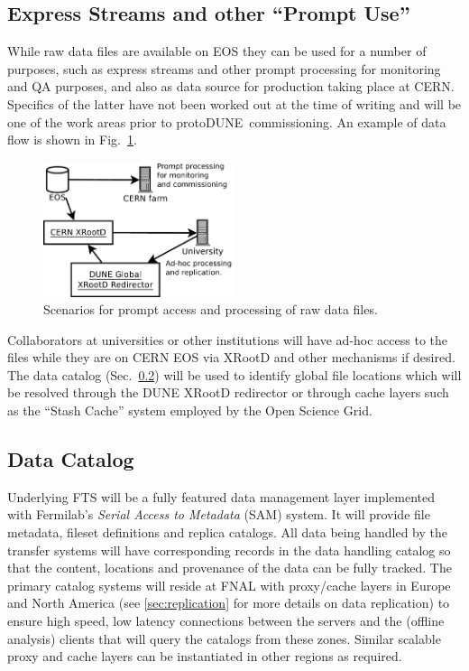 \documentclass[pdftex,12pt,letter]{article}
\newcommand{\pd}{protoDUNE\ }
\begin{document}
\subsection{Express Streams and other ``Prompt Use''}
\label{sec:prompt}

While raw data files are available on EOS they can be
used for a number of purposes, such as express streams and
other prompt processing for monitoring and QA purposes,
and also as data source for production taking place at CERN.
Specifics of the latter have not been  worked out at the time of writing
and will be one of the work areas prior to \pd commissioning.
An example of data flow is shown in Fig.~\ref{fig:prompt}.

\begin{figure}[tbh]
  \centering
  \includegraphics[width=0.5\textwidth]{prompt.pdf}
  \caption{Scenarios for prompt access and processing of raw data files.}
  \label{fig:prompt}
\end{figure}


\noindent Collaborators at universities or other institutions will have ad-hoc
access to the files while they are on CERN EOS via XRootD and other mechanisms if desired. 
The data catalog (Sec.~\ref{sec:sam}) will be used to identify global file
locations which will be resolved through the DUNE XRootD redirector or
through cache layers such as the ``Stash Cache'' system employed by
the Open Science Grid.

\subsection{Data Catalog}
\label{sec:sam}

Underlying FTS will be a fully featured data management layer
implemented with Fermilab's \textit{Serial Access to Metadata} (SAM) system.
It will provide file metadata, fileset definitions and replica
catalogs.  All data being handled by the transfer systems will have
corresponding records in the data handling catalog so that the
content, locations and provenance of the data can be fully tracked.
The primary catalog systems will reside at FNAL with proxy/cache
layers in Europe and North America (see \ref{sec:replication}
for more details on data replication) to ensure high speed,
low latency connections between the servers and the (offline analysis)
clients that will query the catalogs from these zones.  Similar
scalable proxy and cache layers can be instantiated in other regions as required.
\end{document}
